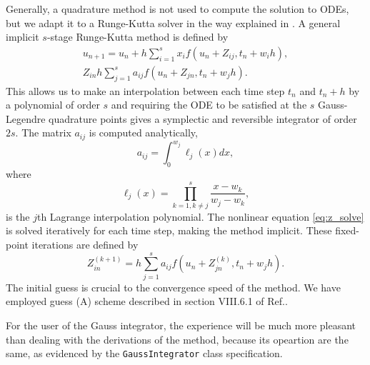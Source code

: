     Generally, a quadrature method is not used to compute the solution to ODEs, but we 
    adapt it to a Runge-Kutta solver in the way explained in 
    \citeauthor{pedersen2019symplectic}\cite{pedersen2019symplectic}. A general 
    implicit $s$-stage Runge-Kutta method is defined by 
    \begin{align}
        u_{n+1} = u_n + h\sum_{i=1}^s x_i f(u_n + Z_{ij}, t_n + w_i h), \\
        \label{eq:z_solve}
        Z_{in} h\sum_{j=1}^s a_{ij} f(u_n + Z_{jn}, t_n + w_j h).
    \end{align}
    This allows us to make an interpolation between each time step $t_n$ and $t_n + h$
    by a polynomial of order $s$ and requiring the ODE to be satisfied at the $s$
    Gauss-Legendre quadrature points gives a symplectic and reversible integrator of
    order $2s$. The matrix $a_{ij}$ is computed analytically,
    \begin{equation}
        a_{ij} = \int_0^{w_j} \ell_j(x) dx,
    \end{equation}
    where
    \begin{equation}
        \ell_j(x) = \prod_{k=1,k\neq j}^s \frac{x - w_k}{w_j - w_k},
    \end{equation}
    is the $j$th Lagrange interpolation polynomial.
    The nonlinear equation \autoref{eq:z_solve} is solved iteratively for each time
    step, making the method implicit. These fixed-point iterations are defined by 
    \begin{equation}
        Z^{(k+1)}_{in} = h\sum_{j=1}^s a_{ij}f(u_n + Z^{(k)}_{jn}, t_n + w_j h).
    \end{equation}
    The initial guess is crucial to the convergence speed of the method. We have 
    employed guess (A) scheme described in section VIII.6.1 of
    Ref.\cite{hairer2006geometric}.

    For the user of the Gauss integrator, the experience will be much more pleasant 
    than dealing with the derivations of the method, because its opeartion
    are the same, as evidenced by the \lstinline{GaussIntegrator}
    class specification. 

    